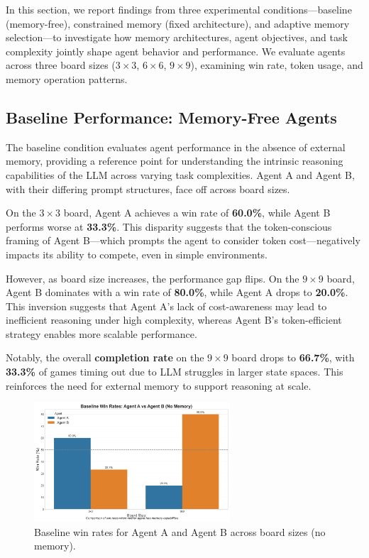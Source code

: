 \documentclass[10pt]{article}
\begin{document}
In this section, we report findings from three experimental conditions---baseline (memory-free), constrained memory (fixed architecture), and adaptive memory selection---to investigate how memory architectures, agent objectives, and task complexity jointly shape agent behavior and performance. We evaluate agents across three board sizes ($3\times3$, $6\times6$, $9\times9$), examining win rate, token usage, and memory operation patterns.

\subsection{Baseline Performance: Memory-Free Agents}

The baseline condition evaluates agent performance in the absence of external memory, providing a reference point for understanding the intrinsic reasoning capabilities of the LLM across varying task complexities. Agent A and Agent B, with their differing prompt structures, face off across board sizes.

On the $3\times3$ board, Agent A achieves a win rate of \textbf{60.0\%}, while Agent B performs worse at \textbf{33.3\%}. This disparity suggests that the token-conscious framing of Agent B---which prompts the agent to consider token cost---negatively impacts its ability to compete, even in simple environments.

However, as board size increases, the performance gap flips. On the $9\times9$ board, Agent B dominates with a win rate of \textbf{80.0\%}, while Agent A drops to \textbf{20.0\%}. This inversion suggests that Agent A's lack of cost-awareness may lead to inefficient reasoning under high complexity, whereas Agent B's token-efficient strategy enables more scalable performance.

Notably, the overall \textbf{completion rate} on the $9\times9$ board drops to \textbf{66.7\%}, with \textbf{33.3\%} of games timing out due to LLM struggles in larger state spaces. This reinforces the need for external memory to support reasoning at scale.

\begin{figure}[H]
\centering
\includegraphics[width=0.65\textwidth]{figures/memory_baseline/baseline_win_rates.png}
\caption{Baseline win rates for Agent A and Agent B across board sizes (no memory).}
\label{fig:baseline_win_rates}
\end{figure}
\end{document}

